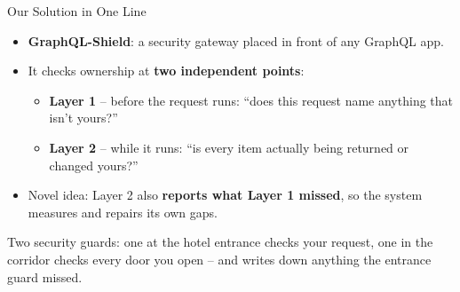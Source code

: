 \documentclass[aspectratio=169,11pt]{beamer}
\begin{document}
\begin{frame}{Our Solution in One Line}
\begin{itemize}
\item \textbf{GraphQL-Shield}: a security gateway placed in front of any GraphQL app.
\item It checks ownership at \textbf{two independent points}:
\begin{itemize}
\item \textbf{Layer 1} – before the request runs: “does this request name anything that isn’t yours?”
\item \textbf{Layer 2} – while it runs: “is every item actually being returned or changed yours?”
\end{itemize}
\item Novel idea: Layer 2 also \textbf{reports what Layer 1 missed}, so the system measures and repairs its own gaps.
\end{itemize}
\vfill
\begin{simplebox}Two security guards: one at the hotel entrance checks your request, one in the corridor checks every door you open – and writes down anything the entrance guard missed.\end{simplebox}
\end{frame}

\end{document}
